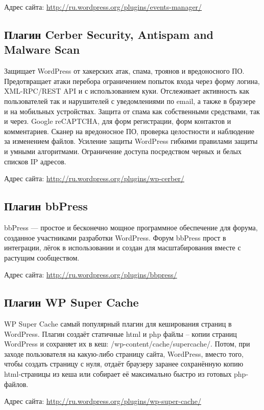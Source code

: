 Адрес сайта: \url{http://ru.wordpress.org/plugins/events-manager/}

\subsection{Плагин Cerber Security, Antispam and Malware Scan}
\label{sec:plugin_serber}

Защищает WordPress от хакерских атак, спама, троянов и вредоносного ПО.
Предотвращает атаки перебора ограничением попыток входа через форму логина, XML-RPC/REST API и с использованием куки.
Отслеживает активность как пользователей так и нарушителей с уведомлениями по email, а также в браузере и на мобильных устройствах.
Защита от спама как собственными средствами, так и через. Google reCAPTCHA, для форм регистрации, форм контактов и комментариев.
Сканер на вредоносное ПО, проверка целостности и наблюдение за изменением файлов.
Усиление защиты WordPress гибкими правилами защиты и умными алгоритмами.
Ограничение доступа посредством черных и белых списков IP адресов.

Адрес сайта: \url{http://ru.wordpress.org/plugins/wp-cerber/}

\subsection{Плагин bbPress}
\label{sec:plugin_bbPress}

bbPress — простое и бесконечно мощное программное обеспечение для форума, созданное участниками разработки WordPress.
Форум bbPress прост в интеграции, лёгок в использовании и создан для масштабирования вместе с растущим сообществом.

Адрес сайта: \url{http://ru.wordpress.org/plugins/bbpress/}

\subsection{Плагин WP Super Cache}
\label{sec:plugin_wp_super_cache}

WP Super Cache самый популярный плагин для кеширования страниц в WordPress.
Плагин создаёт статичные html и php файлы – копии страниц WordPress и сохраняет их в кеш: /wp-content/cache/supercache/. Потом, при заходе пользователя на какую-либо страницу сайта, WordPress, вместо того, чтобы создать страницу с нуля, отдаёт браузеру заранее сохранённую копию html-страницы из кеша или собирает её максимально быстро из готовых php-файлов.

Адрес сайта: \url{http://ru.wordpress.org/plugins/wp-super-cache/}

